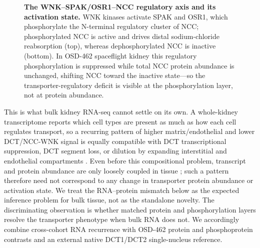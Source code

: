\documentclass[11pt]{article}
\begin{document}
\begin{figure}[t]
\centering
{}
\caption{\textbf{The WNK--SPAK/OSR1--NCC regulatory axis and its activation state.} WNK kinases activate SPAK and OSR1, which phosphorylate the N-terminal regulatory cluster of NCC; phosphorylated NCC is active and drives distal sodium-chloride reabsorption (top), whereas dephosphorylated NCC is inactive (bottom). In OSD-462 spaceflight kidney this regulatory phosphorylation is suppressed while total NCC protein abundance is unchanged, shifting NCC toward the inactive state---so the transporter-regulatory deficit is visible at the phosphorylation layer, not at protein abundance.}
\label{fig:axis}
\end{figure}

This is what bulk kidney RNA-seq cannot settle on its own. A whole-kidney transcriptome reports which cell types are present as much as how each cell regulates transport, so a recurring pattern of higher matrix/endothelial and lower DCT/NCC-WNK signal is equally compatible with DCT transcriptional suppression, DCT segment loss, or dilution by expanding interstitial and endothelial compartments \citep{avilacobos2020deconv,nido2020composition}. Even before this compositional problem, transcript and protein abundance are only loosely coupled in tissue \citep{liu2016dependency}; such a pattern therefore need not correspond to any change in transporter protein abundance or activation state. We treat the RNA--protein mismatch below as the expected inference problem for bulk tissue, not as the standalone novelty. The discriminating observation is whether matched protein and phosphorylation layers resolve the transporter phenotype when bulk RNA does not. We accordingly combine cross-cohort RNA recurrence with OSD-462 protein and phosphoprotein contrasts and an external native DCT1/DCT2 single-nucleus reference.
\end{document}
